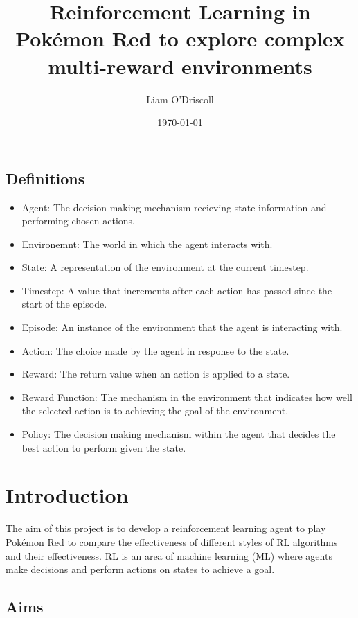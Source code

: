 \documentclass{surrey_disso_style}
\title{Reinforcement Learning in Pokémon Red to explore complex multi-reward environments}
\author{Liam O'Driscoll}
\date{\today}
\begin{document}
\maketitle



\subsection{Definitions}
\begin{itemize}
   \item [\ding{171}] Agent: The decision making mechanism recieving state information and performing chosen actions.
   \item [\ding{171}] Environemnt: The world in which the agent interacts with. 
   \item [\ding{171}] State: A representation of the environment at the current timestep.
   \item [\ding{171}] Timestep: A value that increments after each action has passed since the start of the episode.
   \item [\ding{171}] Episode: An instance of the environment that the agent is interacting with.
   \item [\ding{171}] Action: The choice made by the agent in response to the state.
   \item [\ding{171}] Reward: The return value when an action is applied to a state.
   \item [\ding{171}] Reward Function: The mechanism in the environment that indicates how well the selected action is to achieving the goal of the environment.
   \item [\ding{171}] Policy: The decision making mechanism within the agent that decides the best action to perform given the state.
\end{itemize}
\newpage
\section{Introduction}
The aim of this project is to develop a reinforcement learning agent to play Pokémon Red to compare the effectiveness of different styles of RL algorithms and their effectiveness. RL is an area of machine learning (ML) where agents make decisions and perform actions on states to achieve a goal. 

\subsection{Aims}
\end{document}
